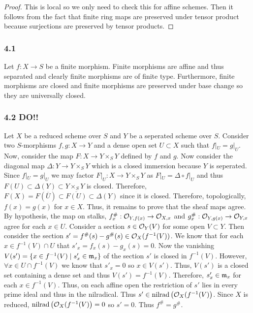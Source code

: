 \documentclass[12pt]{article}
\begin{document}
\begin{proof}
This is local so we only need to check this for affine schemes. Then it follows from the fact that finite ring maps are preserved under tensor product because surjections are preserved by tensor products.
\end{proof}

\subsubsection{4.1}

Let $f : X \to S$ be a finite morphism. Finite morphisms are affine and thus separated and clearly finite morphisms are of finite type. Furthermore, finite morphisms are closed and finite morphisms are preserved under base change so they are universally closed.  

\subsubsection{4.2 DO!!}

Let $X$ be a reduced scheme over $S$ and $Y$ be a seperated scheme over $S$. Consider two $S$-morphisms $f,g : X \to Y$ and a dense open set $U \subset X$ such that $f|_U = g|_U$. Now, consider the map $F : X \to Y \times_S Y$ defined by $f$ and $g$. Now consider the diagonal map $\Delta : Y \to Y \times_S Y$ which is a closed immersion because $Y$ is seperated. Since $f|_U = g|_U$ we may factor $F |_U : X \to Y \times_S Y$ as $F|_U = \Delta \circ f|_U$ and thus $F(U) \subset \Delta(Y) \subset Y \times_S Y$ is closed. Therefore, $F(X) = F(\overline{U}) \subset \overline{F(U)} \subset \Delta(Y)$ since it is closed. Therefore, topologically, $f(x) = g(x)$ for $x \in X$. Thus, it remains to prove that the sheaf maps agree. By hypothesis, the map on stalks, $f^\#_x : \mathcal{O}_{Y, f(x)} \to \mathcal{O}_{X, x}$ and $g^\#_x : \mathcal{O}_{Y, g(x)} \to \mathcal{O}_{Y, x}$ agree for each $x \in U$. Consider a section $s \in \mathcal{O}_{Y}(V)$ for some open $V \subset Y$. Then consider the section $s' = f^\#(s) - g^\#(s) \in \mathcal{O}_{X}(f^{-1}(V))$. We know that for each $x \in f^{-1}(V) \cap U$ that $s'_x = f_x(s) - g_x(s) = 0$. Now the vanishing $V(s') = \{ x \in f^{-1}(V) \mid s'_x \in \mathfrak{m}_x \}$ of the section $s'$ is closed in $f^{-1}(V)$. However, $\forall x \in U \cap f^{-1}(V)$ we know that $s'_x = 0$ so $x \in V(s')$. Thus, $V(s')$ is a closed set containing a dense set and thus $V(s') = f^{-1}(V)$. Therefore, $s'_x \in \mathfrak{m}_x$ for each $x \in f^{-1}(V)$. Thus, on each affine open the restriction of $s'$ lies in every prime ideal and thus in the nilradical. Thus $s' \in \mathrm{nilrad}\left( \mathcal{O}_{X}(f^{-1}(V) \right)$. Since $X$ is reduced, $\mathrm{nilrad}\left( \mathcal{O}_{X}(f^{-1}(V) \right) = 0$ so $s' = 0$. Thus $f^\# = g^\#$. 
\end{document}

